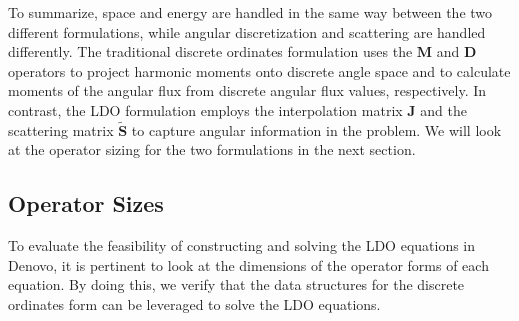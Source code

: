 \documentclass{article} %
\newcommand{\ve}[1]{\ensuremath{\mathbf{#1}}}
\begin{document}
To summarize, space and energy are handled in the same way between the two
different formulations, while angular discretization and scattering are handled
differently. The traditional discrete ordinates formulation uses the $\ve{M}$
and $\ve{D}$ operators to project harmonic moments onto discrete angle space
and to calculate moments of the angular flux from discrete angular flux values,
respectively. In contrast, the LDO formulation employs the interpolation matrix
$\ve{J}$ and the scattering matrix $\ve{\tilde{S}}$ to capture angular
information in the problem. We will look at the
operator sizing for the two formulations in the next section.

\subsection{Operator Sizes}

To evaluate the feasibility of constructing and solving the LDO equations in
Denovo, it is pertinent to look at the dimensions of the operator forms of each
equation. By doing this, we verify that the data structures for the discrete
ordinates form can be leveraged to solve the LDO equations.
\end{document}
